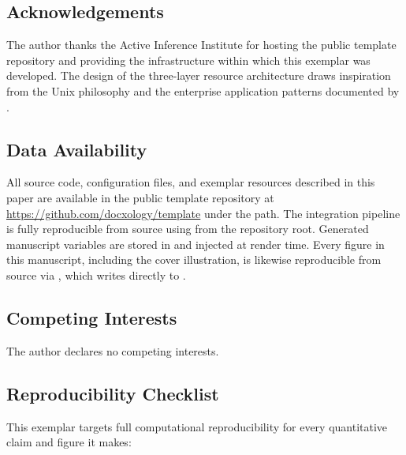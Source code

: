 \documentclass[
]{article}
\begin{document}
\subsection{Acknowledgements}\label{acknowledgements}

The author thanks the Active Inference Institute for hosting the public
template repository and providing the infrastructure within which this
exemplar was developed. The design of the three-layer resource
architecture draws inspiration from the Unix philosophy
\citep{Raymond2003art} and the enterprise application patterns
documented by \citep{Fowler2002patterns}.

\subsection{Data Availability}\label{data-availability}

All source code, configuration files, and exemplar resources described
in this paper are available in the public template repository at
\url{https://github.com/docxology/template} under the
 path. The
integration pipeline is fully reproducible from source using
from the repository root. Generated manuscript variables are stored in
 and injected at render
time. Every figure in this manuscript, including the cover illustration,
is likewise reproducible from source via
,
which writes directly to .

\subsection{Competing Interests}\label{competing-interests}

The author declares no competing interests.

\subsection{Reproducibility Checklist}\label{reproducibility-checklist}

This exemplar targets full computational reproducibility for every
quantitative claim and figure it makes:
\end{document}
